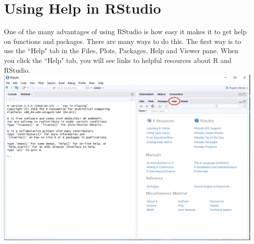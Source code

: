\documentclass[a4paper]{report}
\begin{document}
    \newpage \section{Using Help in RStudio}
        \begin{flushleft}
        One of the many advantages of using RStudio is how easy it makes it to get help on functions and packages. There are many ways to do this. 
        \newline \newline 
        The first way is to use the ``Help" tab in the Files, Plots, Packages, Help and Viewer pane. When you click the ``Help" tab, you will see links to helpful resources about R and RStudio. 
        \includegraphics[width=\textwidth]{images/GH1.png}
        

\end{flushleft}
\end{document}
